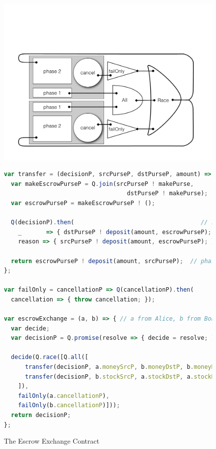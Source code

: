 \documentclass{llncs}
\begin{document}
\begin{figure}[htbp]
\begin{center}
\includegraphics[scale=0.3]{cyclic-circuit.pdf}
\end{center}
\begin{lstlisting}[language=javascript]
var transfer = (decisionP, srcPurseP, dstPurseP, amount) => {
  var makeEscrowPurseP = Q.join(srcPurseP ! makePurse, 
                                   dstPurseP ! makePurse);
  var escrowPurseP = makeEscrowPurseP ! ();

  Q(decisionP).then(                                    // setup phase 2
    _       => { dstPurseP ! deposit(amount, escrowPurseP); },
    reason => { srcPurseP ! deposit(amount, escrowPurseP); });
    
  return escrowPurseP ! deposit(amount, srcPurseP);  // phase 1
};

var failOnly = cancellationP => Q(cancellationP).then(
  cancellation => { throw cancellation; });

var escrowExchange = (a, b) => { // a from Alice, b from Bob
  var decide;
  var decisionP = Q.promise(resolve => { decide = resolve; });

  decide(Q.race([Q.all([
      transfer(decisionP, a.moneySrcP, b.moneyDstP, b.moneyNeeded),
      transfer(decisionP, b.stockSrcP, a.stockDstP, a.stockNeeded)
    ]), 
    failOnly(a.cancellationP), 
    failOnly(b.cancellationP)]));
  return decisionP;
};
\end{lstlisting}
\caption{The Escrow Exchange Contract}
\label{escrowExchange}
\end{figure}
\end{document}
